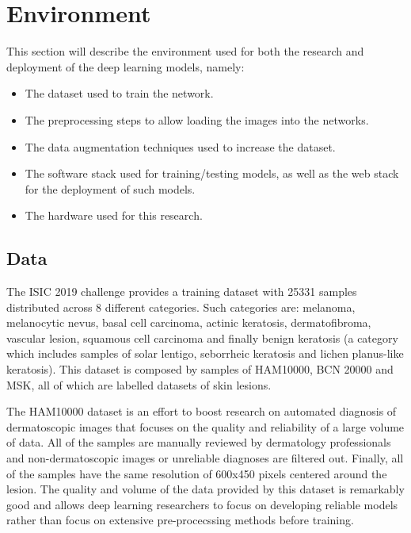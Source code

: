 \chapter{Environment}
\label{chapter:environment}

This section will describe the environment used for both the research and deployment of the deep learning models, namely:

\begin{itemize}
    \item The dataset used to train the network.
    \item The preprocessing steps to allow loading the images into the networks. 
    \item The data augmentation techniques used to increase the dataset. 
    \item The software stack used for training/testing models, as well as the web stack for the deployment of such models.
    \item The hardware used for this research.
\end{itemize}



\section{Data}
    The \ac{ISIC} 2019 challenge \cite{isic2019} provides a training dataset with 25331 samples distributed across 8 different categories. Such categories are: melanoma, melanocytic nevus, basal cell carcinoma, actinic keratosis, dermatofibroma, vascular lesion, squamous cell carcinoma and finally benign keratosis (a category which includes samples of solar lentigo, seborrheic keratosis and lichen planus-like keratosis). This dataset is composed by samples of HAM10000, BCN 20000 and MSK, all of which are labelled datasets of skin lesions.
    
    The \ac{HAM10000} \cite{ham10000} dataset is an effort to boost research on automated diagnosis of dermatoscopic images that focuses on the quality and reliability of a large volume of data. All of the samples are manually reviewed by dermatology professionals and non-dermatoscopic images or unreliable diagnoses are filtered out. Finally, all of the samples have the same resolution of 600x450 pixels centered around the lesion. The quality and volume of the data provided by this dataset is remarkably good and allows deep learning researchers to focus on developing reliable models rather than focus on extensive pre-procecssing methods before training. \par
    
